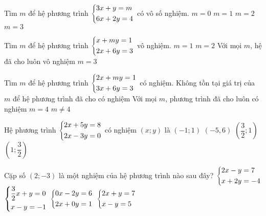 \begin{bt}
	Tìm $m$ để hệ phương trình $\left\{\begin{aligned}&3x+y=m\\&6x+2y=4\end{aligned}\right.$ có vô số nghiệm.
	\choice
	{$m=0$}
	{$m=1$}
	{\True $m=2$}
	{$m=3$}
\end{bt}

\begin{bt}
	Tìm $m$ để hệ phương trình $\left\{\begin{aligned}&x+my=1\\&2x+6y=3\end{aligned}\right.$ vô nghiệm.
	\choice
	{$m=1$}
	{$m=2$}
	{Với mọi $m$, hệ đã cho luôn vô nghiệm}
	{\True $m=3$}
\end{bt}

\begin{bt}
	Tìm $m$ để hệ phương trình $\left\{\begin{aligned}&2x+my=1\\&3x+6y=3\end{aligned}\right.$ có nghiệm.
	\choice
	{Không tồn tại giá trị của $m$ để hệ phương trình đã cho có nghiệm}
	{Với mọi $m$, phương trình đã cho luôn có nghiệm}
	{$m=4$}
	{\True $m\ne4$}
\end{bt}

\begin{bt}
	Hệ phương trình $\left\{\begin{aligned}&2x+5y=8\\&2x-3y=0\end{aligned}\right.$ có nghiệm $(x;y)$ là
	\choice
	{$(-1;1)$}
	{$(-5,6)$}
	{\True $\left(\dfrac{3}{2};1\right)$}
	{$\left(1;\dfrac{3}{2}\right)$}
\end{bt}

\begin{bt}
	Cặp số $(2;-3)$ là một nghiệm của hệ phương trình nào sau đây?
	\choice
	{\True $\left\{\begin{aligned}&2x-y=7\\&x+2y=-4\end{aligned}\right.$}
	{$\left\{\begin{aligned}&\dfrac{3}{2}x+y=0\\&x-y=-1\end{aligned}\right.$}
	{$\left\{\begin{aligned}&0x-2y=6\\&2x+0y=1\end{aligned}\right.$}
	{$\left\{\begin{aligned}&2x+y=7\\&x-y=5\end{aligned}\right.$}
\end{bt}

